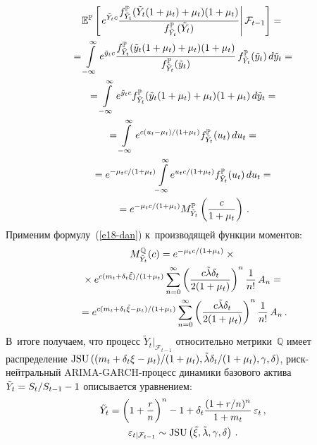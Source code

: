 \begin{multicols}{2}
\noindent
\begin{multline*} 
\mathbb{E}^{\mathbb{P}}\left[ \left. e^{\tilde{Y}_t c} 
\displaystyle\frac{\displaystyle f^{\mathbb{P}}_{\tilde{Y}_t}  (\tilde{Y}_t 
(1+\mu_t)+\mu_t)(1+\mu_t)\mathstrut}{\displaystyle f^{\mathbb{P}}_{\tilde{Y}_t} (\tilde{Y}_t)\mathstrut} 
\right\vert \mathcal{F}_{t-1}\right]={}\\
{}=\int\limits^\infty_{-\infty} e^{\tilde{y}_t c}
\displaystyle\frac{\displaystyle f^{\mathbb{P}}_{\tilde{Y}_t} 
(\tilde{y}_t(1+\mu_t)+\mu_t)(1+\mu_t)\mathstrut}{\displaystyle  
f^{\mathbb{P}}_{\tilde{Y}_t}(\tilde{y}_t)\mathstrut}\,
f^{\mathbb{P}}_{\tilde{Y}_t}(\tilde{y}_t)\,d\tilde{y}_t={}\\
{}= \int\limits_{-\infty}^\infty e^{\tilde{y}_t c} 
f^{\mathbb{P}}_{\tilde{Y}_t}(\tilde{y}_t(1+\mu_t)+\mu_t)
(1+\mu_t)\,d\tilde{y}_t={}
\\
{}= \int\limits^\infty_{-\infty} e^{c{(u_t-\mu_t)}/({1+\mu_t})} 
f^{\mathbb{P}}_{\tilde{Y}_t}(u_t)\,du_t={}\\
{}=
e^{-\mu_t c/(1+\mu_t)} \!\int\limits^\infty_{-\infty}\! 
e^{u_t{c}/({1+\mu_t})} 
f^{\mathbb{P}}_{\tilde{Y}_t}(u_t) \,du_t={}\\
{}=e^{-\mu_t c/(1+\mu_t)} 
M^{\mathbb{P}}_{\tilde{Y}_t} \left( \displaystyle\frac{\displaystyle c\mathstrut}{\displaystyle 1+\mu_t\mathstrut}\right)\,.
\end{multline*}
Применим формулу~(\ref{e18-dan}) к~производящей функции моментов: 
\begin{multline*}
M_{\tilde{Y}_t}^{\mathbb{Q}}(c)=e^{-{\mu_t c}/({1+\mu_t})}\times{}\\
{}\times
e^{c(m_t 
+\delta_t \tilde{\xi})/(1+\mu_t)} 
\sum\limits_{n=0}^\infty \left( \displaystyle\frac{\displaystyle  
c\tilde{\lambda}\delta_t\mathstrut}{\displaystyle 2(1+\mu_t)\mathstrut}\right)^n 
\displaystyle\frac{\displaystyle 1\mathstrut}{\displaystyle n!\mathstrut}\,A_n={}\\
{}=e^{c(m_t+\delta_t\tilde{\xi}-
\mu_t)/(1+\mu_t)}\sum\limits^\infty_{n=0}\left( 
\displaystyle\frac{\displaystyle c\tilde{\lambda}\delta_t\mathstrut}{\displaystyle 2(1+\mu_t)\mathstrut}\right)^n \displaystyle\frac{\displaystyle 1\mathstrut}{\displaystyle n!\mathstrut}\,A_n\,.
\end{multline*}
В~итоге получаем, что процесс $\tilde{Y}_t\vert_{\mathcal{F}_{t-1}}$ 
относительно метрики~$\mathbb{Q}$ имеет распределение 
$\mathrm{JSU}\,((m_t\hm+\delta_t\xi\hm-\mu_t)/(1\hm+\mu_t), \tilde{\lambda}\delta_t/(1+\mu_t), 
\gamma, \delta)$, риск-нейт\-раль\-ный ARIMA-GARCH-процесс динамики 
базового актива $\tilde{Y}_t\hm= S_t/S_{t-1} \hm-1$ описывается уравнением:
\begin{multline*}
\tilde{Y}_t=\left(1+\displaystyle\frac{\displaystyle r\mathstrut}{\displaystyle n\mathstrut}\right)^n-1+
\delta_t\displaystyle\frac{\displaystyle (1+r/n)^n\mathstrut}{\displaystyle 1+m_t\mathstrut}\,\varepsilon_t\,,\\
\varepsilon_{t\vert \mathcal{F}_{t-1}}\sim \mathrm{JSU} \left( \tilde{\xi}, 
\tilde{\lambda},\gamma,\delta\right)\,.
\end{multline*}
  

\end{multicols}
